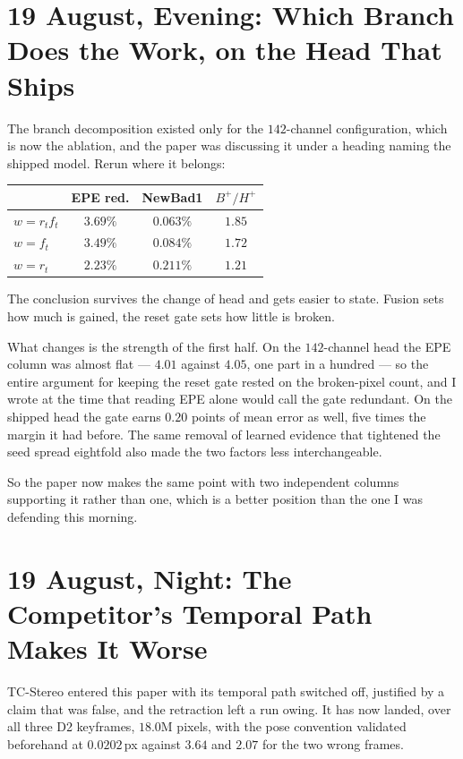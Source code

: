 \documentclass[11pt,a4paper]{article}
\begin{document}
\section*{19 August, Evening: Which Branch Does the Work, on the Head That Ships}

The branch decomposition existed only for the $142$-channel configuration, which
is now the ablation, and the paper was discussing it under a heading naming the
shipped model. Rerun where it belongs:

\begin{center}
\begin{tabular}{lccc}
\toprule
& EPE red. & NewBad1 & $B^+/H^+$ \\
\midrule
$w=r_tf_t$ & $\mathbf{3.69\%}$ & $\mathbf{0.063\%}$ & $\mathbf{1.85}$ \\
$w=f_t$    & $3.49\%$ & $0.084\%$ & $1.72$ \\
$w=r_t$    & $2.23\%$ & $0.211\%$ & $1.21$ \\
\bottomrule
\end{tabular}
\end{center}

The conclusion survives the change of head and gets easier to state. Fusion sets
how much is gained, the reset gate sets how little is broken.

What changes is the strength of the first half. On the $142$-channel head the EPE
column was almost flat --- $4.01$ against $4.05$, one part in a hundred --- so the
entire argument for keeping the reset gate rested on the broken-pixel count, and I
wrote at the time that reading EPE alone would call the gate redundant. On the
shipped head the gate earns $0.20$ points of mean error as well, five times the
margin it had before. The same removal of learned evidence that tightened the seed
spread eightfold also made the two factors less interchangeable.

So the paper now makes the same point with two independent columns supporting it
rather than one, which is a better position than the one I was defending this
morning.

\section*{19 August, Night: The Competitor's Temporal Path Makes It Worse}

TC-Stereo entered this paper with its temporal path switched off, justified by a
claim that was false, and the retraction left a run owing. It has now landed, over
all three D2 keyframes, $18.0$M pixels, with the pose convention validated
beforehand at $0.0202$\,px against $3.64$ and $2.07$ for the two wrong frames.
\end{document}
